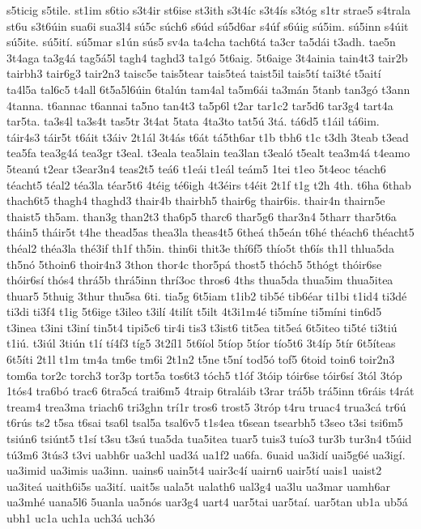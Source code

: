 {s5ticig
s5tile.
st1im
s6tio
s3t4ir
st6ise
st3ith
s3t4íc
s3t4ís
s3tóg
s1tr
strae5
s4trala
st6u
s3t6úin
sua6i
sua3l4
sú5c
súch6
s6úd
sú5d6ar
s4úf
s6úig
sú5im.
sú5inn
s4úit
sú5ite.
sú5ití.
sú5mar
s1ún
sús5
sv4a
ta4cha
tach6tá
ta3cr
ta5dái
t3adh.
tae5n
3t4aga
ta3g4á
tag5á5l
tagh4
taghd3
ta1gó
5t6aig.
5t6aige
3t4ainia
tain4t3
tair2b
tairbh3
tair6g3
tair2n3
taisc5e
tais5tear
tais5teá
taist5il
tais5tí
tai3té
t5aití
ta4l5a
tal6c5
t4all
6t5a5l6úin
6talún
tam4al
ta5m6ái
ta3mán
5tanb
tan3gó
t3ann
4tanna.
t6annac
t6annai
ta5no
tan4t3
ta5p6l
t2ar
tar1c2
tar5d6
tar3g4
tart4a
tar5ta.
ta3s4l
ta3s4t
tas5tr
3t4at
5tata
4ta3to
tat5ú
3tá.
tá6d5
t1áil
tá6im.
táir4s3
táir5t
t6áit
t3áiv
2t1ál
3t4ás
t6át
tá5th6ar
t1b
tbh6
t1c
t3dh
3teab
t3ead
tea5fa
tea3g4á
tea3gr
t3eal.
t3eala
tea5lain
tea3lan
t3ealó
t5ealt
tea3m4á
t4eamo
5teanú
t2ear
t3ear3n4
teas2t5
teá6
t1eái
t1eál
teám5
1tei
t1eo
5t4eoc
téach6
téacht5
téal2
téa3la
téar5t6
4téig
té6igh
4t3éirs
t4éit
2t1f
t1g
t2h
4th.
t6ha
6thab
thach6t5
thagh4
thaghd3
thair4b
thairbh5
thair6g
thair6is.
thair4n
thairn5e
thaist5
th5am.
than3g
than2t3
tha6p5
tharc6
thar5g6
thar3n4
5tharr
thar5t6a
tháin5
tháir5t
t4he
thead5as
thea3la
theas4t5
6theá
th5eán
t6hé
théach6
théacht5
théal2
théa3la
thé3if
th1f
th5in.
thin6i
thit3e
thí6f5
thío5t
th6ís
th1l
thlua5da
th5nó
5thoin6
thoir4n3
3thon
thor4c
thor5pá
thost5
thóch5
5thógt
thóir6se
thóir6sí
thós4
thrá5b
thrá5inn
thrí3oc
thros6
4ths
thua5da
thua5im
thua5itea
thuar5
5thuig
3thur
thu5sa
6ti.
tia5g
6t5iam
t1ib2
tib5é
tib6éar
ti1bi
t1id4
ti3dé
ti3di
ti3f4
t1ig
5t6ige
t3ileo
t3ilí
4tilít
t5ilt
4t3i1m4é
ti5míne
ti5míni
tin6d5
t3inea
t3ini
t3iní
tin5t4
tipi5c6
tir4i
tis3
t3ist6
tit5ea
tit5eá
6t5iteo
ti5té
ti3tiú
t1iú.
t3iúl
3tiún
t1í
tí4f3
tíg5
3t2íl1
5t6íol
5tíop
5tíor
tío5t6
3t4íp
5tír
6t5íteas
6t5íti
2t1l
t1m
tm4a
tm6e
tm6i
2t1n2
t5ne
t5ní
tod5ó
tof5
6toid
toin6
toir2n3
tom6a
tor2c
torch3
tor3p
tort5a
tos6t3
tóch5
t1óf
3tóip
tóir6se
tóir6sí
3tól
3tóp
1tós4
tra6bó
trac6
6tra5cá
trai6m5
4traip
6traláib
t3rar
trá5b
trá5inn
t6ráis
t4rát
tream4
trea3ma
triach6
tri3ghn
trí1r
tros6
trost5
3tróp
t4ru
truac4
trua3cá
tr6ú
t6rús
ts2
t5sa
t6sai
tsa6l
tsal5a
tsal6v5
t1s4ea
t6sean
tsearbh5
t3seo
t3si
tsi6m5
tsiún6
tsiúnt5
t1sí
t3su
t3sú
tua5da
tua5itea
tuar5
tuis3
tuío3
tur3b
tur3n4
t5úid
tú3m6
3tús3
t3vi
uabh6r
ua3chl
uad3á
ua1f2
ua6fa.
6uaid
ua3idí
uai5g6é
ua3igí.
ua3imid
ua3imis
ua3inn.
uains6
uain5t4
uair3c4í
uairn6
uair5tí
uais1
uaist2
ua3iteá
uaith6i5s
ua3ití.
uait5s
uala5t
ualath6
ual3g4
ua3lu
ua3mar
uamh6ar
ua3mhé
uana5l6
5uanla
ua5nós
uar3g4
uart4
uar5tai
uar5taí.
uar5tan
ub1a
ub5á
ubh1
uc1a
uch1a
uch3á
uch3ó
}
